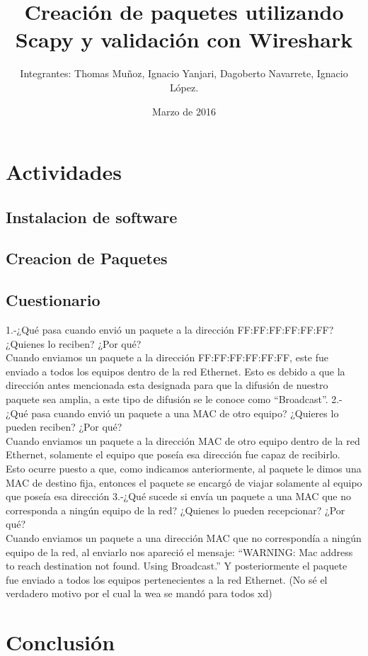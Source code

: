 \documentclass{udpreport}
\title{Creación de paquetes utilizando Scapy y validación con Wireshark}
\author{Integrantes: Thomas Muñoz, Ignacio Yanjari, Dagoberto Navarrete, Ignacio López.}
\date{Marzo de 2016}
\begin{document}
\maketitle
\tableofcontents
\chapter{Actividades}
	\section{Instalacion de software}

	\section{Creacion de Paquetes}
		
	\section{Cuestionario}
	
	  1.-¿Qué pasa cuando envió un paquete a la dirección FF:FF:FF:FF:FF:FF? ¿Quienes
	     lo reciben? ¿Por qué?\\
	     Cuando enviamos un paquete a la dirección FF:FF:FF:FF:FF:FF, este fue enviado a todos los equipos dentro de la red
	     Ethernet. Esto es debido a que la dirección antes mencionada esta designada para que la difusión de nuestro paquete sea
	     amplia, a este tipo de difusión se le conoce como “Broadcast”.
	  2.-¿Qué pasa cuando envió un paquete a una MAC de otro equipo? ¿Quieres lo
	      pueden reciben? ¿Por qué?\\
	      Cuando enviamos un paquete a la dirección MAC de otro equipo dentro de la red Ethernet, solamente el equipo que poseía
	      esa dirección fue capaz de recibirlo. Esto ocurre puesto a que, como indicamos anteriormente, al paquete le dimos una
	      MAC de destino fija, entonces el paquete se encargó de viajar solamente al equipo que poseía esa dirección
	  3.-¿Qué sucede si envía un paquete a una MAC que no corresponda a ningún equipo
	      de la red? ¿Quienes lo pueden recepcionar? ¿Por qué?\\
	      Cuando enviamos un paquete a una dirección MAC que no correspondía a ningún equipo de la red, al enviarlo nos apareció
	      el mensaje: “WARNING: Mac address to reach destination not found. Using Broadcast.” Y posteriormente el paquete fue
	      enviado a todos los equipos pertenecientes a la red Ethernet. (No sé el verdadero motivo por el cual la wea se mandó
	      para todos xd)

\chapter{Conclusión}
  
\begin{thebibliography}{x}

\end{thebibliography}
\end{document}
